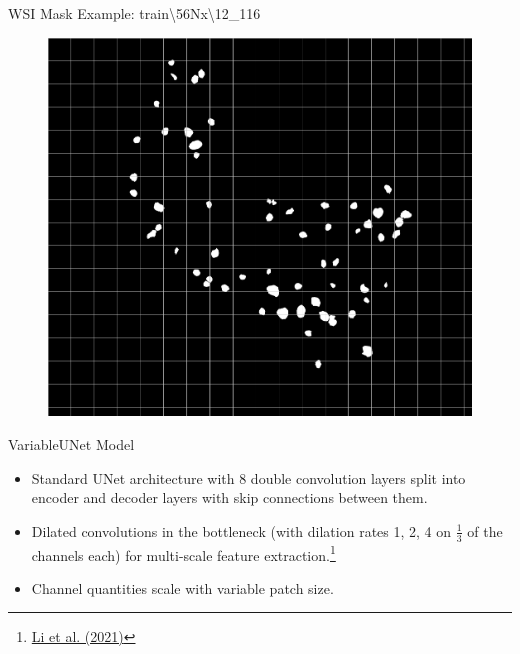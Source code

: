 \documentclass{beamer}
\begin{document}
\begin{frame}{WSI Mask Example: train\textbackslash56Nx\textbackslash12\_116}
    \begin{figure}
        \vspace{-0.14cm}
        \centering
        \includegraphics[height=0.877\textheight]{Images/mask_thumbnail_with_grid.png}
    \end{figure}

\end{frame}

\begin{frame}{VariableUNet Model}
    \begin{itemize}
        \item Standard UNet architecture with 8 double convolution layers split into encoder and decoder layers with skip connections between them.
        \item Dilated convolutions in the bottleneck (with dilation rates 1, 2, 4 on $\frac{1}{3}$ of the channels each) for multi-scale feature extraction.\footnote{\href{https://doi.org/10.1117/1.JMI.8.6.067501}{Li et al. (2021)}}
        \item Channel quantities scale with variable patch size.
    \end{itemize}
    
        
\end{frame}
\end{document}
